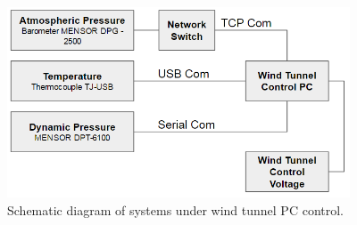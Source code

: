 \vspace{32pt}
\begin{figure}[H]
\centering
\includegraphics[width=4in]{figs/setup/odulswt_control}
\caption{Schematic diagram of systems under wind tunnel PC control.}
\label{fig:control_diagram}
\end{figure}


